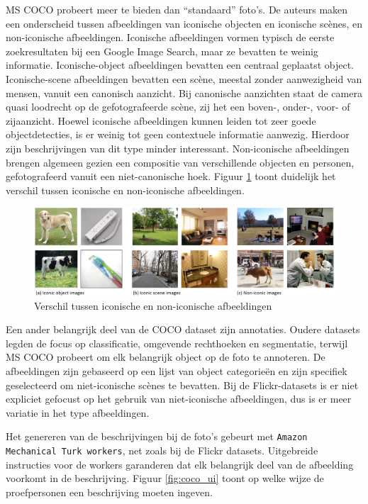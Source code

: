 MS COCO probeert meer te bieden dan ``standaard'' foto's. De auteurs maken een onderscheid tussen afbeeldingen van iconische objecten en iconische sc\`enes, en non-iconische afbeeldingen. Iconische afbeeldingen vormen typisch de eerste zoekresultaten bij een Google Image Search, maar ze bevatten te weinig informatie. Iconische-object afbeeldingen bevatten een centraal geplaatst object. Iconische-scene afbeeldingen bevatten een sc\`ene, meestal zonder aanwezigheid van mensen, vanuit een canonisch aanzicht. Bij canonische aanzichten staat de camera quasi loodrecht op de gefotografeerde sc\`ene, zij het een boven-, onder-, voor- of zijaanzicht. Hoewel iconische afbeeldingen kunnen leiden tot zeer goede objectdetecties, is er weinig tot geen contextuele informatie aanwezig. Hierdoor zijn beschrijvingen van dit type minder interessant. 
Non-iconische afbeeldingen brengen algemeen gezien een compositie van verschillende objecten en personen, gefotografeerd vanuit een niet-canonische hoek. Figuur \ref{fig:cocotypes} toont duidelijk het verschil tussen iconische en non-iconische afbeeldingen.

\begin{figure}[tb]
    \centering
    \includegraphics[width=\linewidth]{Images/iconic.jpg}
    \caption{Verschil tussen iconische en non-iconische afbeeldingen}
    \label{fig:cocotypes}
\end{figure}

Een ander belangrijk deel van de COCO dataset zijn annotaties. Oudere datasets legden de focus op classificatie, omgevende rechthoeken en segmentatie, terwijl MS COCO probeert om elk belangrijk object op de foto te annoteren. De afbeeldingen zijn gebaseerd op een lijst van object categorie\"en en zijn specifiek geselecteerd om niet-iconische sc\`enes te bevatten. Bij de Flickr-datasets is er niet expliciet gefocust op het gebruik van niet-iconische afbeeldingen, dus is er meer variatie in het type afbeeldingen.

Het genereren van de beschrijvingen bij de foto's gebeurt met \texttt{Amazon Mechanical Turk workers}, net zoals bij de Flickr datasets. Uitgebreide instructies voor de workers garanderen dat elk belangrijk deel van de afbeelding voorkomt in de beschrijving\cite{Rampf2015}. Figuur \ref{fig:coco_ui} toont op welke wijze de proefpersonen een beschrijving moeten ingeven.


